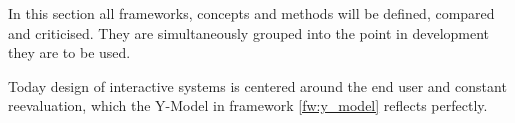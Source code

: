 In this section all frameworks, concepts and methods will be defined, compared and criticised. They are simultaneously grouped into the point in development they are to be used.

Today design of interactive systems is centered around the end user and constant reevaluation, which the Y-Model in framework \ref{fw:y_model} reflects perfectly.

\begin{framework}[Y-Model] \label{fw:y_model} 
  
\end{framework}
